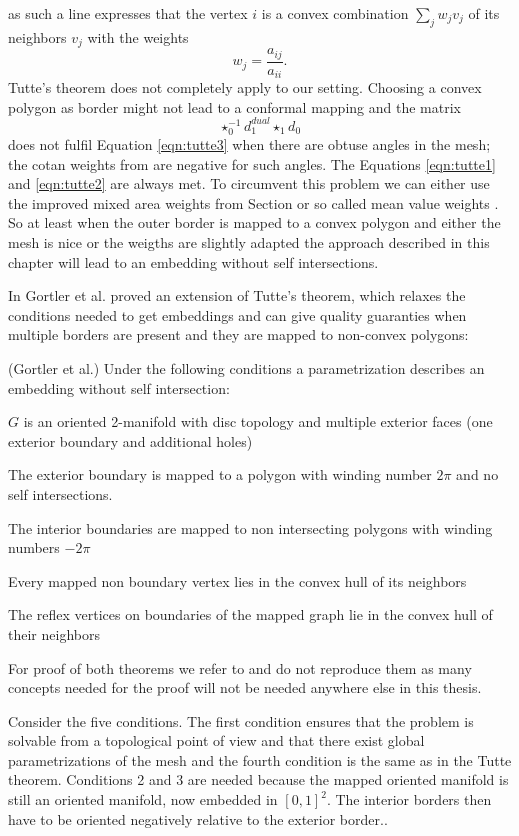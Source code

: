 as such a line expresses that the vertex $i$ is a convex combination $\sum_j w_j v_j$ of its neighbors $v_j$ with the weights
\[w_j = \frac{a_{ij}}{a_{ii}}.\]
Tutte's theorem does not completely apply to our setting. Choosing a convex polygon as border might not lead to a conformal mapping and the matrix
\[\star_0^{-1} d_1^{dual} \star_1 d_0\]
does not fulfil Equation \ref{eqn:tutte3} when there are obtuse angles in the mesh; the cotan weights from  are negative for such angles. The Equations \ref{eqn:tutte1} and \ref{eqn:tutte2} are always met. 
To circumvent this problem we can either use the improved mixed area weights from Section  or so called mean value weights . So at least when the outer border is mapped to a convex polygon and either the mesh is nice or the weigths are slightly adapted the approach described in this chapter will lead to an embedding without self intersections.

In  Gortler et al. proved an extension of Tutte's theorem, which relaxes the conditions needed to get embeddings and can give quality guaranties when multiple borders are present and they are mapped to non-convex polygons:

\begin{thm}(Gortler et al.) Under the following conditions a parametrization describes an embedding without self intersection:
\begin{packed_enum}
\item $G$ is an oriented 2-manifold with disc topology and multiple exterior faces (one exterior boundary and additional holes)
\item The exterior boundary is mapped to a polygon with winding number $2\pi$ and no self intersections.
\item The interior boundaries are mapped to non intersecting polygons with winding numbers $-2\pi$
\item Every mapped non boundary vertex lies in the convex hull of its neighbors
\item The reflex vertices on boundaries of the mapped graph lie in the convex hull of their neighbors
\end{packed_enum}
\end{thm}
For proof of both theorems we refer to  and do not reproduce them as many concepts needed for the proof will not be needed anywhere else in this thesis.

Consider the five conditions. The first condition ensures that the problem is solvable from a topological point of view and that there exist global parametrizations of the mesh and the fourth condition is the same as in the Tutte theorem. Conditions 2 and 3 are needed because the mapped oriented manifold is still an oriented manifold, now embedded in $[0,1]^2$. The interior borders then have to be oriented negatively relative to the exterior border.. 

